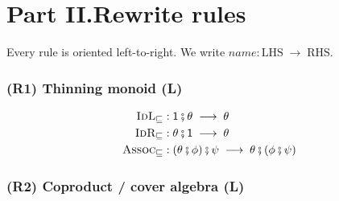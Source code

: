 \documentclass{article}
\newcommand{\thin}{\sqsubseteq}                    %
\newcommand{\oi}{\mathsf{1}}                        %
\newcommand{\comp}{\mathbin{\fatsemi}}              %
\newcommand{\rw}{\;\longrightarrow\;}              %
\newcommand{\catL}{\textbf{(L)}}
\theoremstyle{plain}
\begin{document}
\part*{Part II.\quad Rewrite rules}\label{sec:rules}

\noindent
Every rule is oriented left-to-right.
We write $\mathit{name} : \mathrm{LHS} \rw \mathrm{RHS}$.

\section{(R1) Thinning monoid \hfill \catL}\label{r:thin}
\begin{align}
  \textsc{IdL}_{\thin} &: \oi\comp\theta \rw \theta \label{r:thinIdL}\\
  \textsc{IdR}_{\thin} &: \theta\comp\oi \rw \theta \label{r:thinIdR}\\
  \textsc{Assoc}_{\thin} &: (\theta\comp\phi)\comp\psi \rw \theta\comp(\phi\comp\psi) \label{r:thinAssoc}
\end{align}

\section{(R2) Coproduct / cover algebra \hfill \catL}\label{r:cover}
\end{document}
